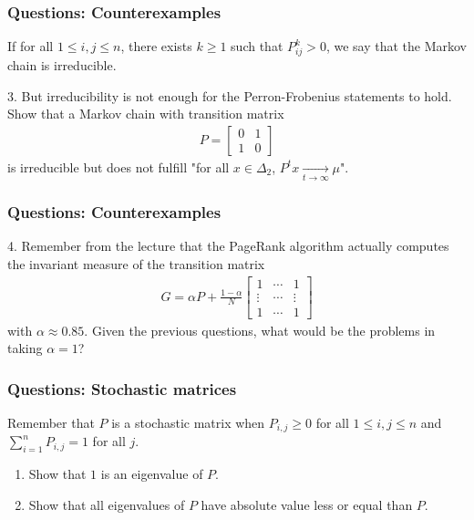 \documentclass{beamer}
\begin{document}
\begin{frame}[t]
\frametitle{Questions: Counterexamples}
\vspace{-10pt}
\begin{definition}
If for all $1 \leq i,j \leq n$, there exists $k \geq 1$ such that $P^{k}_{ij} > 0$, we say that the Markov chain is irreducible.
\end{definition}
3. But irreducibility is not enough for the Perron-Frobenius statements to hold. Show that a Markov chain with transition matrix
\begin{align*}
P = 
\begin{bmatrix}
0 & 1 \\
1 & 0
\end{bmatrix}
\end{align*}
is irreducible but does not fulfill "for all $x \in \Delta_2$,  $P^t x \xrightarrow[t \to \infty]{} \mu$".
\pause
\end{frame}

\begin{frame}[t]
\frametitle{Questions: Counterexamples}
4. Remember from the lecture that the PageRank algorithm actually computes the invariant measure of the transition matrix
\begin{align*}
G = \alpha P + \frac{1-\alpha}{N} 
\begin{bmatrix} 
1 & \cdots & 1 \\
\vdots & \cdots & \vdots \\
1 & \cdots & 1
\end{bmatrix}
\end{align*}
with $\alpha \approx 0.85$. Given the previous questions, what would be the problems in taking $\alpha = 1$? 
\pause
\end{frame}

\begin{frame}[t]
\frametitle{Questions: Stochastic matrices}
Remember that  $P$ is a stochastic matrix when $P_{i,j} \geq 0$ for all $1 \leq i,j \leq n$ and $\sum_{i=1}^n P_{i,j} = 1$ for all $j$. 
\begin{enumerate}
\item Show that $1$ is an eigenvalue of $P$.
\item Show that all eigenvalues of $P$ have absolute value less or equal than $P$.
\end{enumerate}
\pause
\pause
\end{frame}
\end{document}
